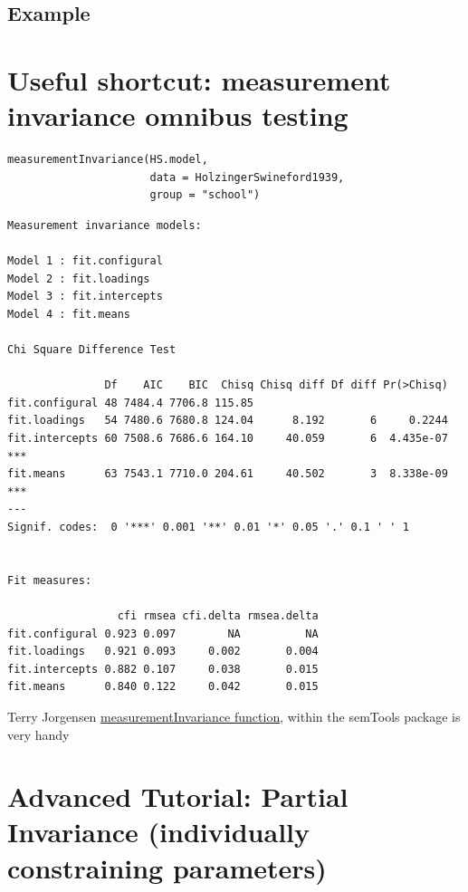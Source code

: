 \documentclass[
]{book}
\begin{document}
\hypertarget{example}{%
\subsection{Example}\label{example}}

\hypertarget{useful-shortcut-measurement-invariance-omnibus-testing}{%
\section{Useful shortcut: measurement invariance omnibus testing}\label{useful-shortcut-measurement-invariance-omnibus-testing}}

\begin{verbatim}
measurementInvariance(HS.model, 
                      data = HolzingerSwineford1939, 
                      group = "school")
\end{verbatim}

\begin{verbatim}
Measurement invariance models:

Model 1 : fit.configural
Model 2 : fit.loadings
Model 3 : fit.intercepts
Model 4 : fit.means

Chi Square Difference Test

               Df    AIC    BIC  Chisq Chisq diff Df diff Pr(>Chisq)    
fit.configural 48 7484.4 7706.8 115.85                                  
fit.loadings   54 7480.6 7680.8 124.04      8.192       6     0.2244    
fit.intercepts 60 7508.6 7686.6 164.10     40.059       6  4.435e-07 ***
fit.means      63 7543.1 7710.0 204.61     40.502       3  8.338e-09 ***
---
Signif. codes:  0 '***' 0.001 '**' 0.01 '*' 0.05 '.' 0.1 ' ' 1


Fit measures:

                 cfi rmsea cfi.delta rmsea.delta
fit.configural 0.923 0.097        NA          NA
fit.loadings   0.921 0.093     0.002       0.004
fit.intercepts 0.882 0.107     0.038       0.015
fit.means      0.840 0.122     0.042       0.015
\end{verbatim}

Terry Jorgensen \href{https://www.rdocumentation.org/packages/semTools/versions/0.4-14/topics/measurementInvariance}{measurementInvariance function}, within the semTools package is very handy

\hypertarget{advanced-tutorial-partial-invariance-individually-constraining-parameters}{%
\section{Advanced Tutorial: Partial Invariance (individually constraining parameters)}\label{advanced-tutorial-partial-invariance-individually-constraining-parameters}}
\end{document}
